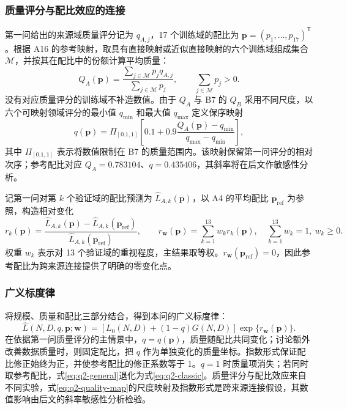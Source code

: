 \subsubsection{质量评分与配比效应的连接}

第一问给出的来源域质量评分记为 $q_{A,j}$，17 个训练域的配比为 $\boldsymbol p=(p_1,\ldots,p_{17})^\mathsf T$。根据 A16 的参考映射，取具有直接映射或近似直接映射的六个训练域组成集合 $\mathcal M$，并按其在配比中的份额计算平均质量：
\begin{equation}
 Q_A(\boldsymbol p)=
 \frac{\sum_{j\in\mathcal M}p_jq_{A,j}}
      {\sum_{j\in\mathcal M}p_j},
 \qquad \sum_{j\in\mathcal M}p_j>0.
 \label{eq:q2-qa}
\end{equation}
没有对应质量评分的训练域不补造数值。由于 $Q_A$ 与 B7 的 $Q_B$ 采用不同尺度，以六个可映射领域评分的最小值 $q_{\min}$ 和最大值 $q_{\max}$ 定义保序映射
\begin{equation}
 q(\boldsymbol p)=\Pi_{[0.1,1]}\!\left[
 0.1+0.9\frac{Q_A(\boldsymbol p)-q_{\min}}
 {q_{\max}-q_{\min}}\right],
 \label{eq:q2-quality-map}
\end{equation}
其中 $\Pi_{[0.1,1]}$ 表示将数值限制在 B7 的质量范围内。该映射保留第一问评分的相对次序；参考配比对应 $Q_A=0.783104$、$q=0.435406$，其斜率将在后文作敏感性分析。

记第一问对第 $k$ 个验证域的配比预测为 $\widehat L_{A,k}(\boldsymbol p)$，以 A4 的平均配比 $\boldsymbol p_{\mathrm{ref}}$ 为参照，构造相对变化
\begin{equation}
 r_k(\boldsymbol p)=
 \frac{\widehat L_{A,k}(\boldsymbol p)
       -\widehat L_{A,k}(\boldsymbol p_{\mathrm{ref}})}
      {\widehat L_{A,k}(\boldsymbol p_{\mathrm{ref}})},
 \qquad
 r_{\boldsymbol w}(\boldsymbol p)=\sum_{k=1}^{13}w_kr_k(\boldsymbol p),
 \quad \sum_{k=1}^{13}w_k=1,\ w_k\geqslant0.
 \label{eq:q2-mixture-effect}
\end{equation}
权重 $w_k$ 表示对 13 个验证域的重视程度，主结果取等权。$r_{\boldsymbol w}(\boldsymbol p_{\mathrm{ref}})=0$，因此参考配比为跨来源连接提供了明确的零变化点。

\subsubsection{广义标度律}

将规模、质量和配比三部分结合，得到本问的广义标度律：
\begin{equation}
 \boxed{\widehat L(N,D,q,\boldsymbol p;\boldsymbol w)
 =\left[L_0(N,D)+(1-q)G(N,D)\right]
       \exp\!\bigl\{r_{\boldsymbol w}(\boldsymbol p)\bigr\}.}
 \label{eq:q2-general}
\end{equation}
在依据第一问质量评分的主情景中，$q=q(\boldsymbol p)$，质量随配比共同变化；讨论额外改善数据质量时，则固定配比，把 $q$ 作为单独变化的质量坐标。指数形式保证配比修正始终为正，并使参考配比的修正系数等于 1。$q=1$ 时质量项消失；若同时取参考配比，式\eqref{eq:q2-general}退化为式\eqref{eq:q2-classic}。质量评分与配比效应来自不同实验，式\eqref{eq:q2-quality-map}的尺度映射及指数形式是跨来源连接假设，其数值影响由后文的斜率敏感性分析检验。

